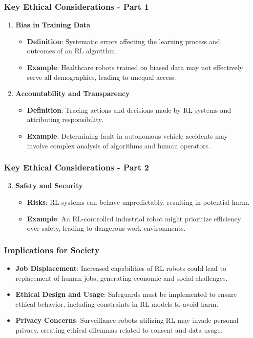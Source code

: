 \documentclass{beamer}
\begin{document}
\begin{frame}[fragile]
    \frametitle{Key Ethical Considerations - Part 1}
    \begin{enumerate}
        \item \textbf{Bias in Training Data}
        \begin{itemize}
            \item \textbf{Definition}: Systematic errors affecting the learning process and outcomes of an RL algorithm.
            \item \textbf{Example}: Healthcare robots trained on biased data may not effectively serve all demographics, leading to unequal access.
        \end{itemize}

        \item \textbf{Accountability and Transparency}
        \begin{itemize}
            \item \textbf{Definition}: Tracing actions and decisions made by RL systems and attributing responsibility.
            \item \textbf{Example}: Determining fault in autonomous vehicle accidents may involve complex analysis of algorithms and human operators.
        \end{itemize}
    \end{enumerate}
\end{frame}

\begin{frame}[fragile]
    \frametitle{Key Ethical Considerations - Part 2}
    \begin{enumerate}
        \setcounter{enumi}{2}
        \item \textbf{Safety and Security}
        \begin{itemize}
            \item \textbf{Risks}: RL systems can behave unpredictably, resulting in potential harm.
            \item \textbf{Example}: An RL-controlled industrial robot might prioritize efficiency over safety, leading to dangerous work environments.
        \end{itemize}
    \end{enumerate}
\end{frame}

\begin{frame}[fragile]
    \frametitle{Implications for Society}
    \begin{itemize}
        \item \textbf{Job Displacement}: Increased capabilities of RL robots could lead to replacement of human jobs, generating economic and social challenges.
        \item \textbf{Ethical Design and Usage}: Safeguards must be implemented to ensure ethical behavior, including constraints in RL models to avoid harm.
        \item \textbf{Privacy Concerns}: Surveillance robots utilizing RL may invade personal privacy, creating ethical dilemmas related to consent and data usage.
    \end{itemize}
\end{frame}
\end{document}
